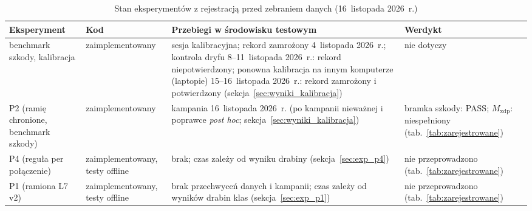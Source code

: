 \documentclass[a4paper,12pt]{article}
\begin{document}
\begin{table}[H]
\centering
\small
\caption{Stan eksperymentów z rejestracją przed zebraniem danych (16~listopada 2026~r.)}\label{tab:stan_eksperymentow}
\begin{tabularx}{\linewidth}{@{}L{3.3cm}L{3.3cm}YL{2.5cm}@{}}
\toprule
Eksperyment & Kod & Przebiegi w środowisku testowym & Werdykt \\
\midrule
benchmark szkody, kalibracja & zaimplementowany & sesja kalibracyjna; rekord zamrożony 4~listopada 2026~r.; kontrola dryfu 8--11~listopada 2026~r.: rekord niepotwierdzony; ponowna kalibracja na innym komputerze (laptopie) 15--16~listopada 2026~r.: rekord zamrożony i potwierdzony (sekcja~\ref{sec:wyniki_kalibracja}) & nie dotyczy \\
P2 (ramię chronione, benchmark szkody) & zaimplementowany & kampania 16~listopada 2026~r. (po kampanii nieważnej i poprawce \textit{post hoc}; sekcja~\ref{sec:wyniki_kalibracja}) & bramka szkody: PASS; $M_{\mathrm{xdp}}$: niespełniony (tab.~\ref{tab:zarejestrowane}) \\
P4 (reguła per połączenie) & zaimplementowany, testy offline & brak; czas zależy od wyniku drabiny (sekcja~\ref{sec:exp_p4}) & nie przeprowadzono (tab.~\ref{tab:zarejestrowane}) \\
P1 (ramiona L7 v2) & zaimplementowany, testy offline & brak przechwyceń danych i kampanii; czas zależy od wyników drabin klas (sekcja~\ref{sec:exp_p1}) & nie przeprowadzono (tab.~\ref{tab:zarejestrowane}) \\
\bottomrule
\end{tabularx}
\end{table}
\end{document}
